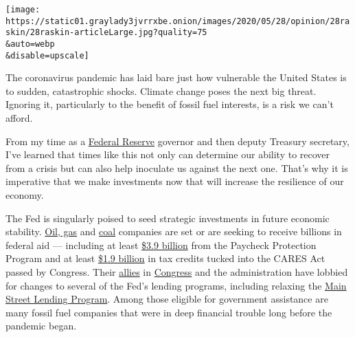 \texttt{[image: https://static01.graylady3jvrrxbe.onion/images/2020/05/28/opinion/28raskin/28raskin-articleLarge.jpg?quality=75\\\&auto=webp\\\&disable=upscale]}

The coronavirus pandemic has laid bare just how vulnerable the United
States is to sudden, catastrophic shocks. Climate change poses the next
big threat. Ignoring it, particularly to the benefit of fossil fuel
interests, is a risk we can't afford.

From my time as a
\href{https://www.nytimes3xbfgragh.onion/2020/06/10/business/economy/fed-june-meeting-coronavirus.html}{Federal
Reserve} governor and then deputy Treasury secretary, I've learned that
times like this not only can determine our ability to recover from a
crisis but can also help inoculate us against the next one. That's why
it is imperative that we make investments now that will increase the
resilience of our economy.

The Fed is singularly poised to seed strategic investments in future
economic stability.
\href{https://www.washingtonpost.com/news/powerpost/paloma/the-energy-202/2020/05/01/the-energy-202-oil-and-gas-companies-stand-to-gain-from-fed-loosening-coronavirus-loan-rules/5eab0bda602ff15fb0021673/}{Oil,
gas} and
\href{https://www.reuters.com/article/us-health-coronavirus-coal/u-s-coal-mining-industry-seeks-wide-ranging-coronavirus-bailout-letter-idUSKBN21701F}{coal}
companies are set or are seeking to receive billions in federal aid ---
including at least
\href{https://westernvaluesproject.org/over-one-third-of-all-oil-gas-and-mining-corporations-already-awarded-bailout-funds/}{\$3.9
billion} from the Paycheck Protection Program and at least
\href{https://www.bloomberg.com/news/articles/2020-05-15/-stealth-bailout-shovels-millions-of-dollars-to-oil-companies?sref=oUjKJw8m}{\$1.9
billion} in tax credits tucked into the CARES Act passed by Congress.
Their
\href{https://www.cruz.senate.gov/files/documents/Letters/4.24.2020\%20Oil\%20Gas\%20Fed\%20Lending\%20Facility\%20Letter.pdf}{allies}
in
\href{https://senatorkevincramer.app.box.com/s/981sfgn44nmkr8fq5hhf6xryxro6fyvp}{Congress}
and the administration have lobbied for changes to several of the Fed's
lending programs, including relaxing the
\href{https://www.bloomberg.com/news/articles/2020-05-12/energy-chief-says-fed-was-asked-to-expand-lending-for-oil-firms}{Main
Street Lending Program}. Among those eligible for government assistance
are many fossil fuel companies that were in deep financial trouble long
before the pandemic began.

